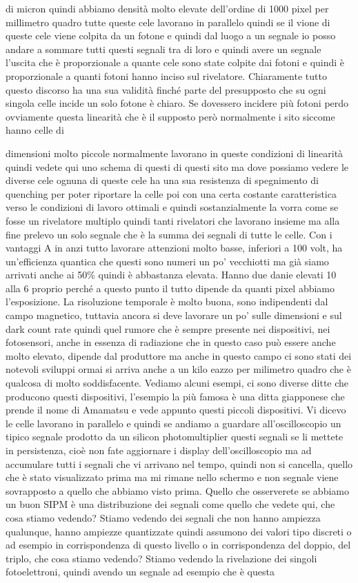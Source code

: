 {di micron quindi abbiamo densità molto elevate dell'ordine di 1000 pixel per millimetro quadro tutte queste cele lavorano in parallelo quindi se il vione di queste cele viene colpita da un fotone e quindi dal luogo a un segnale io posso andare a sommare tutti questi segnali tra di loro e quindi avere un segnale l'uscita che è proporzionale a quante cele sono state colpite dai fotoni e quindi è proporzionale a quanti fotoni hanno inciso sul rivelatore. Chiaramente tutto questo discorso ha una sua validità finché parte del presupposto che su ogni singola celle incide un solo fotone è chiaro. Se dovessero incidere più fotoni perdo ovviamente questa linearità che è il supposto però normalmente i sito siccome hanno celle di 

dimensioni molto piccole normalmente lavorano in queste condizioni di linearità quindi vedete qui uno schema di questi di questi sito ma dove possiamo vedere le diverse cele ognuna di queste cele ha una sua resistenza di spegnimento di quenching per poter riportare la celle poi con una certa costante caratteristica verso le condizioni di lavoro ottimali e quindi sostanzialmente la vorra come se fosse un rivelatore multiplo quindi tanti rivelatori che lavorano insieme ma alla fine prelevo un solo segnale che è la summa dei segnali di tutte le celle. Con i vantaggi A in anzi tutto lavorare attenzioni molto basse, inferiori a 100 volt, ha un'efficienza quantica che questi sono numeri un po' vecchiotti ma già siamo arrivati anche ai 50\% quindi è abbastanza elevata. Hanno due danie elevati 10 alla 6 proprio perché a questo punto il tutto dipende da quanti pixel abbiamo l'esposizione. La risoluzione temporale è molto buona, sono indipendenti dal campo magnetico, tuttavia ancora si deve lavorare un po' sulle dimensioni e sul dark count rate quindi quel rumore che è sempre presente nei dispositivi, nei fotosensori, anche in essenza di radiazione che in questo caso può essere anche molto elevato, dipende dal produttore ma anche in questo campo ci sono stati dei notevoli sviluppi ormai si arriva anche a un kilo eazzo per milimetro quadro che è qualcosa di molto soddisfacente. Vediamo alcuni esempi, ci sono diverse ditte che producono questi dispositivi, l'esempio la più famosa è una ditta giapponese che prende il nome di Amamatsu e vede appunto questi piccoli dispositivi. Vi dicevo le celle lavorano in parallelo e quindi se andiamo a guardare all'oscilloscopio un tipico segnale prodotto da un silicon photomultiplier questi segnali se li mettete in persistenza, cioè non fate aggiornare i display dell'oscilloscopio ma ad accumulare tutti i segnali che vi arrivano nel tempo, quindi non si cancella, quello che è stato visualizzato prima ma mi rimane nello schermo e non segnale viene sovrapposto a quello che abbiamo visto prima. Quello che osserverete se abbiamo un buon SIPM è una distribuzione dei segnali come quello che vedete qui, che cosa stiamo vedendo? Stiamo vedendo dei segnali che non hanno ampiezza qualunque, hanno ampiezze quantizzate quindi assumono dei valori tipo discreti o ad esempio in corrispondenza di questo livello o in corrispondenza del doppio, del triplo, che cosa stiamo vedendo? Stiamo vedendo la rivelazione dei singoli fotoelettroni, quindi avendo un segnale ad esempio che è questa }
